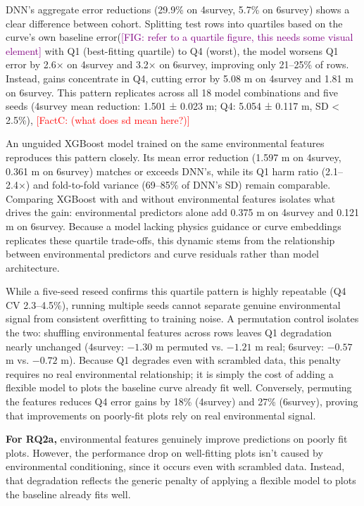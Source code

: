 \documentclass[logo,msc,ai]{infthesis}           %
\newcommand{\fc}[1]{\textcolor{red}{[FactC: #1]}}
\newcommand{\fig}[1]{\textcolor{purple}{[FIG: #1]}}
\begin{document}
DNN’s aggregate error reductions (29.9\% on 4survey, 5.7\% on 6survey) shows a clear difference between cohort. Splitting test rows into quartiles based on the curve's own baseline error(\fig{refer to a quartile figure, this needs some visual element} with Q1 (best-fitting
quartile) to Q4 (worst), the model worsens Q1 error by 2.6× on 4survey and 3.2× on 6survey, improving only 21–25\% of rows. Instead, gains concentrate in Q4, cutting error by 5.08 m on 4survey and 1.81 m on 6survey. This pattern replicates across all 18 model combinations and five seeds (4survey mean reduction: 1.501 ± 0.023 m; Q4: 5.054 ± 0.117 m, SD < 2.5\%), \fc{(what does sd mean here?)}

An unguided XGBoost model trained on the same environmental features reproduces this pattern closely. Its mean error reduction (1.597 m on 4survey, 0.361 m on 6survey) matches or exceeds DNN's, while its Q1 harm ratio (2.1–2.4×) and fold-to-fold variance (69–85\% of DNN's SD) remain comparable. Comparing XGBoost with and without environmental features isolates what drives the gain: environmental predictors alone add 0.375 m on 4survey and 0.121 m on 6survey. Because a model lacking physics guidance or curve embeddings replicates these quartile trade-offs, this dynamic stems from the relationship between environmental predictors and curve residuals rather than model architecture. 

While a five-seed reseed confirms this quartile pattern is highly repeatable (Q4 CV 2.3–4.5\%), running multiple seeds cannot separate genuine environmental signal from consistent overfitting to training noise. A permutation control isolates the two: shuffling environmental features across rows leaves Q1 degradation nearly unchanged (4survey: $-1.30$ m permuted vs. $-1.21$ m real; 6survey: $-0.57$ m vs. $-0.72$ m). Because Q1 degrades even with scrambled data, this penalty requires no real environmental relationship; it is simply the cost of adding a flexible model to plots the baseline curve already fit well. Conversely, permuting the features reduces Q4 error gains by 18\% (4survey) and 27\% (6survey), proving that improvements on poorly-fit plots rely on real environmental signal.

\textbf{For RQ2a,} environmental features genuinely improve predictions on poorly fit plots. However, the performance drop on well-fitting plots isn't caused by environmental conditioning, since it occurs even with scrambled data. Instead, that degradation reflects the generic penalty of applying a flexible model to plots the baseline already fits well.
\end{document}
